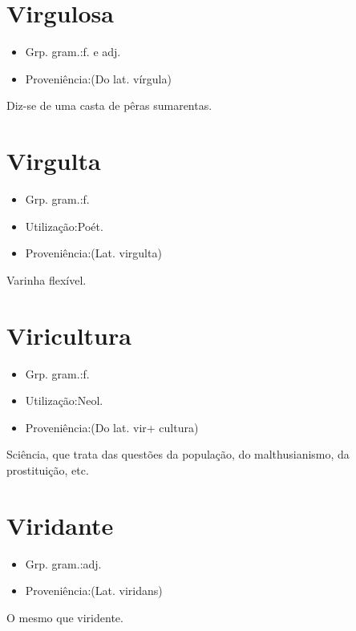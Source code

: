\documentclass{article}
\begin{document}
\section{Virgulosa}
\begin{itemize}
\item {Grp. gram.:f.  e  adj.}
\end{itemize}
\begin{itemize}
\item {Proveniência:(Do lat. \textunderscore vírgula\textunderscore )}
\end{itemize}
Diz-se de uma casta de pêras sumarentas.
\section{Virgulta}
\begin{itemize}
\item {Grp. gram.:f.}
\end{itemize}
\begin{itemize}
\item {Utilização:Poét.}
\end{itemize}
\begin{itemize}
\item {Proveniência:(Lat. \textunderscore virgulta\textunderscore )}
\end{itemize}
Varinha flexível.
\section{Viricultura}
\begin{itemize}
\item {Grp. gram.:f.}
\end{itemize}
\begin{itemize}
\item {Utilização:Neol.}
\end{itemize}
\begin{itemize}
\item {Proveniência:(Do lat. \textunderscore vir\textunderscore  + \textunderscore cultura\textunderscore )}
\end{itemize}
Sciência, que trata das questões da população, do malthusianismo, da prostituição, etc.
\section{Viridante}
\begin{itemize}
\item {Grp. gram.:adj.}
\end{itemize}
\begin{itemize}
\item {Proveniência:(Lat. \textunderscore viridans\textunderscore )}
\end{itemize}
O mesmo que \textunderscore viridente\textunderscore .
\end{document}
